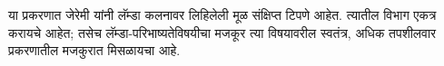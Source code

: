 \documentclass[../../../include/open-logic-chapter]{subfiles}
\begin{document}

\begin{editorial}
या प्रकरणात जेरेमी यांनी लॅम्डा कलनावर लिहिलेली मूळ संक्षिप्त टिपणे आहेत.
त्यातील विभाग एकत्र करायचे आहेत; तसेच लॅम्डा-परिभाष्यतेविषयीचा मजकूर
त्या विषयावरील स्वतंत्र, अधिक तपशीलवार प्रकरणातील मजकुरात मिसळायचा आहे.
\end{editorial}














\OLEndChapterHook
\end{document}
